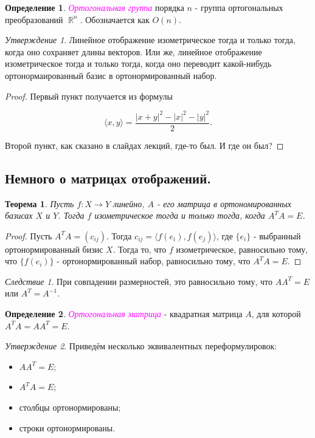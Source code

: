 \documentclass[a4paper,100pt]{article}
\theoremstyle{indented}
\newtheorem{theorem}{Теорема}
\theoremstyle{definition}
\newtheorem{defn}{Определение}
\theoremstyle{remark}
\newtheorem{cons}{Следствие}
\newtheorem{stat}{Утверждение}
\DeclareMathOperator{\ra}{\rightarrow}
\DeclareMathOperator{\RR}{\mathbb{R}}
\begin{document}
\begin{defn}
    \textit{\textcolor{magenta}{\hypertarget{s74}{Ортогональная группа}}} порядка $n$ - группа ортогональных преобразований $\RR^n$. Обозначается как $O(n)$. 
\end{defn}

\begin{stat}
    Линейное отображение изометрическое тогда и только тогда, когда оно сохраняет длины векторов. Или же, линейное отображение изометрическое тогда и только тогда, когда оно переводит какой-нибудь ортонормаированный базис в ортонормированный набор.
\end{stat}

\begin{proof}
    Первый пункт получается из формулы 

    \[
        \langle x, y \rangle  = \frac{|x+y|^2 - |x|^2 - |y|^2}{2}.
    \]

    Второй пункт, как сказано в слайдах лекций, где-то был. И где он был?
\end{proof}

\subsection{Немного о матрицах отображений.}

\begin{theorem}
    Пусть $f:X\ra Y$ линейно, $A$ - его матрица в ортономированных базисах $X$ и $Y$. Тогда $f$ изометрическое тогда и только тогда, когда $A^TA=E$. 
\end{theorem}

\begin{proof}
    Пусть $A^T A = (c_{ij})$. Тогда $c_{ij} = \langle f(e_i), f(e_j) \rangle$, где $\{e_i\}$ - выбранный ортонормированный бизис $X$. Тогда то, что $f$ изометрическое, равносильно тому, что $\{f(e_i)\}$ - ортонормированный набор, равносильно тому, что $A^T A = E$. 
\end{proof}

\begin{cons}
    При совпадении размерностей, это равносильно тому, что $AA^T=E$ или $A^T=A^{-1}$.
\end{cons}

\begin{defn}
    \textit{\textcolor{magenta}{\hypertarget{s75}{Ортогональная матрица}}} - квадратная матрица $A$, для которой $A^TA=AA^T=E$. 
\end{defn}

\begin{stat}
    Приведём несколько эквивалентных переформулировок:

    \begin{itemize}
        \item $AA^T = E$; 
        \item $A^T A = E$; 
        \item столбцы ортонормированы; 
        \item строки ортонормированы.
    \end{itemize}
\end{stat}
\end{document}
